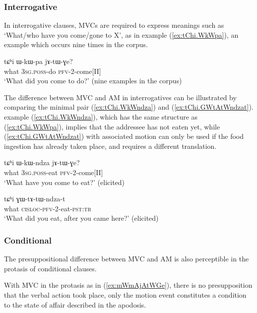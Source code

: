  

\subsubsection{Interrogative} \label{sec:am.interrogative}
In interrogative clauses, MVCs are required to express meanings such as `What/who have you come/gone to X', as in example (\ref{ex:tChi.WkWpa}), an example which occurs nine times in the corpus.

\begin{exe}
\ex \label{ex:tChi.WkWpa}
\gll tɕʰi ɯ-kɯ-pa jɤ-tɯ-ɣe? \\
what \textsc{3sg.poss}-do \textsc{pfv}-2-come[II] \\
\glt `What did you come to do?' (nine examples in the corpus)
\end{exe}

The difference between MVC and AM in interrogatives can be illustrated by comparing the minimal pair  (\ref{ex:tChi.WkWndza}) and (\ref{ex:tChi.GWtAtWndzat}). example (\ref{ex:tChi.WkWndza}), which has the same structure as (\ref{ex:tChi.WkWpa}), implies that the addressee has not eaten yet, while (\ref{ex:tChi.GWtAtWndzat}) with associated motion can only be used if the food ingestion has already taken place, and requires a different translation.

\begin{exe}
\ex \label{ex:tChi.WkWndza}
\gll tɕʰi ɯ-kɯ-ndza jɤ-tɯ-ɣe? \\
what \textsc{3sg.poss}-eat \textsc{pfv}-2-come[II] \\
\glt `What have you come to eat?' (elicited)
\end{exe}

\begin{exe}
\ex \label{ex:tChi.GWtAtWndzat}
\gll tɕʰi ɣɯ-tɤ-tɯ-ndza-t \\
what \textsc{cisloc}-\textsc{pfv}-2-eat-\textsc{pst:tr}    \\
\glt `What did you eat, after you came here?' (elicited)
\end{exe}

\subsubsection{Conditional} \label{sec:am.conditional}
The presuppositional difference between MVC and AM is also perceptible in the protasis of conditional clauses. 

With MVC in the protasis as in (\ref{ex:mWmAjAtWGe}), there is no presupposition that the verbal action took place, only the motion event constitutes a condition to the state of affair described in the apodosis.

